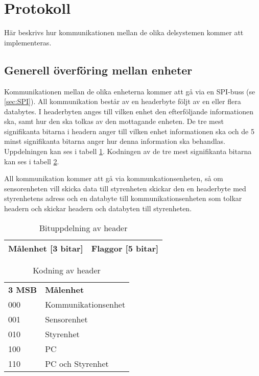 \section{Protokoll}
\label{sec:Protokoll}
Här beskrivs hur kommunikationen mellan de olika delsystemen kommer att implementeras.

\subsection{Generell överföring mellan enheter}
Kommunikationen mellan de olika enheterna kommer att gå via en SPI-buss (se \ref{sec:SPI}).
All kommunikation består av en headerbyte följt av en eller flera databytes.
I headerbyten anges till vilken enhet den efterföljande informationen ska, samt hur den ska tolkas av den mottagande enheten.
De tre mest signifikanta bitarna i headern anger till vilken enhet informationen ska och de 5 minst signifikanta bitarna anger 
hur denna information ska behandlas. Uppdelningen kan ses i tabell \ref{tab:header}.
Kodningen av de tre mest signifikanta bitarna kan ses i tabell \ref{tab:headerkod}.

All kommunikation kommer att gå via kommunkationsenheten, så om sensorenheten vill 
skicka data till styrenheten skickar den en headerbyte med styrenhetens adress och en databyte till kommunikationsenheten som 
tolkar headern och skickar headern och databyten till styrenheten.
\begin{table}[h]
  \centering
  \begin{tabular}{| c | c |}
    \hline
    Målenhet [3 bitar] & Flaggor [5 bitar]\\
    \hline
  \end{tabular}
  \caption{Bituppdelning av header}
  \label{tab:header}
\end{table}

\begin{table}[h]
  \centering
  \begin{tabular}{l l}
    \textbf{3 MSB} & \textbf{Målenhet} \\
    000 & Kommunikationsenhet \\
    001 & Sensorenhet \\
    010 & Styrenhet \\
    100 & PC \\
    110 & PC och Styrenhet\\
  \end{tabular}
  \caption{Kodning av header}
  \label{tab:headerkod}
\end{table}


